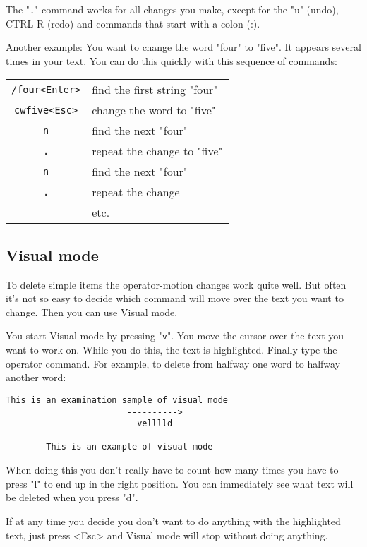 The "\verb!.!" command works for all changes you make, except for the "u" (undo),
CTRL-R (redo) and commands that start with a colon (:).

Another example: You want to change the word "four" to "five".
It appears several times in your text.
You can do this quickly with this sequence of commands:

\begin{center}
\begin{tabular}{c l}
				\verb!/four<Enter>! & find the first string "four"\\
				\verb!cwfive<Esc>! & change the word to "five"\\
				\verb!n! & find the next "four"\\
				\verb!.! & repeat the change to "five"\\
				\verb!n! & find the next "four"\\
				\verb!.! & repeat the change\\
						& etc.
\end{tabular}
\end{center}

\subsection{Visual mode}

To delete simple items the operator-motion changes work quite well.
But often it's not so easy to decide which command will move over the text you want to change.
Then you can use Visual mode.

You start Visual mode by pressing "\verb!v!".
You move the cursor over the text you want to work on.
While you do this, the text is highlighted.
Finally type the operator command.
For example, to delete from halfway one word to halfway another word:

\begin{Verbatim}[samepage=true]
        This is an examination sample of visual mode 
                        ---------->
                          velllld

        This is an example of visual mode 
\end{Verbatim}

When doing this you don't really have to count how many times you have to press "l" to end up in the right position.
You can immediately see what text will be deleted when you press "d".

If at any time you decide you don't want to do anything with the highlighted text, just press <Esc> and Visual mode will stop without doing anything.
 

